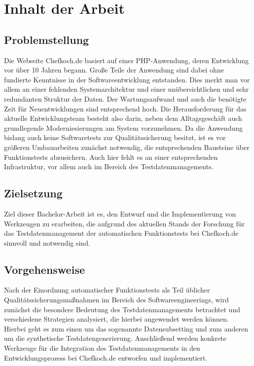 \section{Inhalt der Arbeit}

\subsection{Problemstellung}

Die Webseite Chefkoch.de basiert auf einer PHP-Anwendung, deren Entwicklung vor über 10 Jahren begann. Große Teile der Anwendung sind dabei ohne fundierte Kenntnisse in der Softwareentwicklung entstanden. Dies merkt man vor allem an einer fehlenden Systemarchitektur und einer unübersichtlichen und sehr redundanten Struktur der Daten. Der Wartungsaufwand und auch die benötigte Zeit für Neuentwicklungen sind entsprechend hoch. Die Herausforderung für das aktuelle Entwicklungsteam besteht also darin, neben dem Alltagsgeschäft auch grundlegende Moderniesierungen am System vorzunehmen. Da die Anwendung bislang auch keine Softwaretests zur Qualitätssicherung besitzt, ist es vor größeren Umbauarbeiten zunächst notwendig, die entsprechenden Bausteine über Funktionstests abzusichern. Auch hier fehlt es an einer entsprechenden Infrastruktur, vor allem auch im Bereich des Testdatenmanagements.

\subsection{Zielsetzung}

Ziel dieser Bachelor-Arbeit ist es, den Entwurf und die Implementierung von Werkzeugen zu erarbeiten, die aufgrund des aktuellen Stands der Forschung für das Testdatenmanagement der automatischen Funktionstests bei Chefkoch.de sinnvoll und notwendig sind.

\subsection{Vorgehensweise}

Nach der Einordnung automatischer Funktionstests als Teil üblicher Qualitätssicherungsmaßnahmen im Bereich des Softwareengineerings, wird zunächst die besondere Bedeutung des Testdatenmanagements betrachtet und verschiedene Strategien analysiert, die hierbei angewendet werden können. Hierbei geht es zum einen um das sogenannte Datensubsetting und zum anderen um die synthetische Testdatengenerierung. Anschließend werden konkrete Werkzeuge für die Integration des Testdatenmanagements in den Entwicklungsprozess bei Chefkoch.de entworfen und implementiert.

